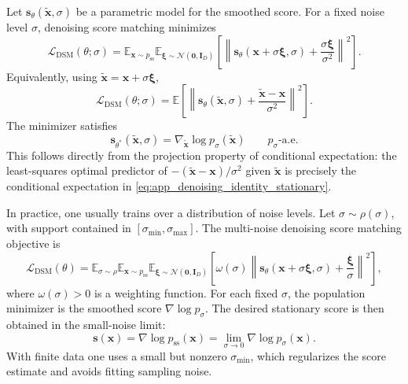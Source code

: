 \documentclass[11pt,twoside,fleqn]{article}
\begin{document}
Let $\bm{s}_\theta(\widetilde{\bm{x}},\sigma)$ be a parametric model for the smoothed score. For a fixed noise level $\sigma$, denoising score matching minimizes
\begin{equation}
    \mathcal{L}_{\mathrm{DSM}}(\theta;\sigma)
    =
    \mathbb{E}_{\bm{x}\sim p_{\mathrm{ss}}}
    \mathbb{E}_{\bm{\xi}\sim\mathcal{N}(\bm{0},\bm{I}_D)}
    \left[
        \left\|
            \bm{s}_\theta(\bm{x}+\sigma\bm{\xi},\sigma)
            +
            \frac{\sigma\bm{\xi}}{\sigma^2}
        \right\|^2
    \right].
    \label{eq:app_dsm_loss_fixed_sigma}
\end{equation}
Equivalently, using $\widetilde{\bm{x}}=\bm{x}+\sigma\bm{\xi}$,
\begin{equation}
    \mathcal{L}_{\mathrm{DSM}}(\theta;\sigma)
    =
    \mathbb{E}
    \left[
        \left\|
            \bm{s}_\theta(\widetilde{\bm{x}},\sigma)
            +
            \frac{\widetilde{\bm{x}}-\bm{x}}{\sigma^2}
        \right\|^2
    \right].
    \label{eq:app_dsm_loss_fixed_sigma_tilde}
\end{equation}
The minimizer satisfies
\begin{equation}
    \bm{s}_{\theta^\ast}(\widetilde{\bm{x}},\sigma)
    =
    \nabla_{\widetilde{\bm{x}}}
    \log p_\sigma(\widetilde{\bm{x}})
    \qquad
    p_\sigma\text{-a.e.}
    \label{eq:app_dsm_optimality}
\end{equation}
This follows directly from the projection property of conditional expectation: the least-squares optimal predictor of
$-(\widetilde{\bm{x}}-\bm{x})/\sigma^2$ given $\widetilde{\bm{x}}$ is precisely the conditional expectation in \eqref{eq:app_denoising_identity_stationary}.

In practice, one usually trains over a distribution of noise levels. Let $\sigma\sim\rho(\sigma)$, with support contained in $[\sigma_{\min},\sigma_{\max}]$. The multi-noise denoising score matching objective is
\begin{equation}
    \mathcal{L}_{\mathrm{DSM}}(\theta)
    =
    \mathbb{E}_{\sigma\sim\rho}
    \mathbb{E}_{\bm{x}\sim p_{\mathrm{ss}}}
    \mathbb{E}_{\bm{\xi}\sim\mathcal{N}(\bm{0},\bm{I}_D)}
    \left[
        \omega(\sigma)
        \left\|
            \bm{s}_\theta(\bm{x}+\sigma\bm{\xi},\sigma)
            +
            \frac{\bm{\xi}}{\sigma}
        \right\|^2
    \right],
    \label{eq:app_multinoise_dsm_loss}
\end{equation}
where $\omega(\sigma)>0$ is a weighting function. For each fixed $\sigma$, the population minimizer is the smoothed score $\nabla\log p_\sigma$. The desired stationary score is then obtained in the small-noise limit:
\begin{equation}
    \bm{s}(\bm{x})
    =
    \nabla\log p_{\mathrm{ss}}(\bm{x})
    =
    \lim_{\sigma\to 0}
    \nabla\log p_\sigma(\bm{x}).
    \label{eq:app_score_small_noise_limit}
\end{equation}
With finite data one uses a small but nonzero $\sigma_{\min}$, which regularizes the score estimate and avoids fitting sampling noise.
\end{document}
